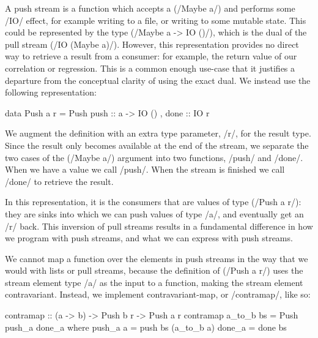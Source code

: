 A push stream is a function which accepts a (\Hs/Maybe a/) and performs some \Hs/IO/ effect, for example writing to a file, or writing to some mutable state.
This could be represented by the type (\Hs/Maybe a -> IO ()/), which is the dual of the pull stream (\Hs/IO (Maybe a)/).
However, this representation provides no direct way to retrieve a result from a consumer: for example, the return value of our correlation or regression.
This is a common enough use-case that it justifies a departure from the conceptual clarity of using the exact dual.
We instead use the following representation:

\begin{haskell}
data Push a r = Push
  { push :: a -> IO ()
  , done :: IO r }
\end{haskell}

We augment the definition with an extra type parameter, \Hs/r/, for the result type.
Since the result only becomes available at the end of the stream, we separate the two cases of the (\Hs/Maybe a/) argument into two functions, \Hs/push/ and \Hs/done/.
When we have a value we call \Hs/push/.
When the stream is finished we call \Hs/done/ to retrieve the result.




In this representation, it is the consumers that are values of type (\Hs/Push a r/): they are sinks into which we can push values of type \Hs/a/, and eventually get an \Hs/r/ back.
This inversion of pull streams results in a fundamental difference in how we program with push streams, and what we can express with push streams.

We cannot map a function over the elements in push streams in the way that we would with lists or pull streams, because the definition of (\Hs/Push a r/) uses the stream element type \Hs/a/ as the input to a function, making the stream element contravariant.
Instead, we implement contravariant-map, or \Hs/contramap/, like so:

\begin{haskell}
contramap :: (a -> b) -> Push b r -> Push a r
contramap a_to_b bs = Push push_a done_a
 where
  push_a a = push bs (a_to_b a)
  done_a   = done bs
\end{haskell}

